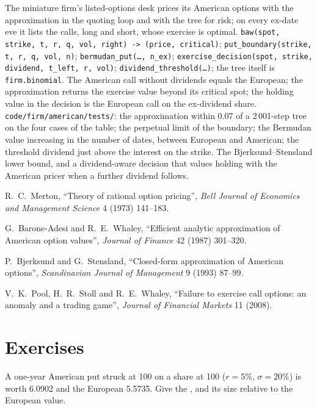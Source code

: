\begin{build}
 The miniature firm's listed-options desk prices its American options
with the approximation in the quoting loop and with the tree for risk; on every ex-date
eve it lists the calls, long and short, whose exercise is optimal.
 \texttt{baw(spot, strike, t, r, q, vol, right) -> (price, critical)};
\texttt{put\_boundary(strike, t, r, q, vol, n)}; \texttt{bermudan\_put(\ldots, n\_ex)};
\texttt{exercise\_decision(spot, strike, dividend, t\_left, r, vol)};
\texttt{dividend\_threshold(\ldots)}; the tree itself is \texttt{firm.binomial}.
 The American call without dividends equals the European; the approximation
returns the exercise value beyond its critical spot; the holding value in the decision is
the European call on the ex-dividend share.
 \texttt{code/firm/american/tests/}: the approximation within
0.07 of a 2\,001-step tree on the four cases of the table; the perpetual limit of the
boundary; the Bermudan value increasing in the number of dates, between European and
American; the threshold dividend just above the interest on the strike.
 The Bjerksund--Stensland lower bound, and a dividend-aware decision that
values holding with the American pricer when a further dividend follows.
\end{build}

\begin{omsources}
\item R.~C.~Merton, ``Theory of rational option pricing'', \emph{Bell Journal of Economics
and Management Science} 4 (1973) 141--183.
\item G.~Barone-Adesi and R.~E.~Whaley, ``Efficient analytic approximation of American
option values'', \emph{Journal of Finance} 42 (1987) 301--320.
\item P.~Bjerksund and G.~Stensland, ``Closed-form approximation of American options'',
\emph{Scandinavian Journal of Management} 9 (1993) 87--99.
\item V.~K.~Pool, H.~R.~Stoll and R.~E.~Whaley, ``Failure to exercise call options: an
anomaly and a trading game'', \emph{Journal of Financial Markets} 11 (2008).
\end{omsources}

\section{Exercises}

\begin{exercise}[$\star$]\label{exo:dv:american-options-and-early-exercise:1}
A one-year American put struck at 100 on a share at 100 ($r=5\%$, $\sigma=20\%$) is worth
6.0902 and the European 5.5735. Give the , and its size relative to
the European value.
\end{exercise}

